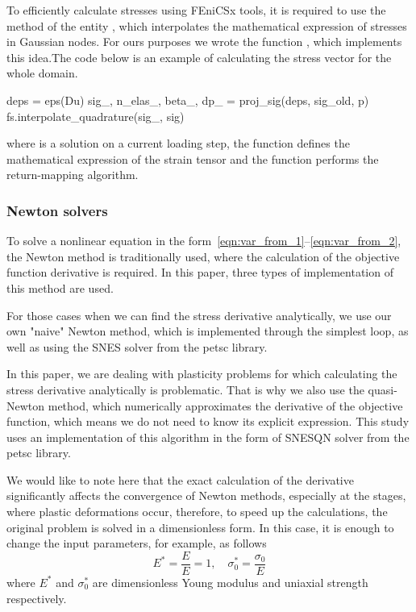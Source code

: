 \documentclass[12pt]{article}
\begin{document}
To efficiently calculate stresses using FEniCSx tools, it is required to use the  method of the entity , which interpolates the mathematical expression of stresses in Gaussian nodes. For ours purposes we wrote the function , which implements this idea.The code below is an example of calculating the stress vector for the whole domain.
\begin{pythoncode}
    deps = eps(Du)
    sig_, n_elas_, beta_, dp_ = proj_sig(deps, sig_old, p)
    fs.interpolate_quadrature(sig_, sig)
\end{pythoncode}
where  is a solution on a current loading step, the function  defines the mathematical expression of the strain tensor and the function  performs the return-mapping algorithm.

\subsubsection{Newton solvers}
To solve a nonlinear equation in the form~\ref{eqn:var_from_1}--\ref{eqn:var_from_2}, the Newton method is traditionally used, where the calculation of the objective function derivative is required. In this paper, three types of implementation of this method are used.

For those cases when we can find the stress derivative analytically, we use our own "naive" Newton method, which is implemented through the simplest loop, as well as using the SNES solver from the petsc library. 

In this paper, we are dealing with plasticity problems for which calculating the stress derivative analytically is problematic. That is why we also use the quasi-Newton method, which numerically approximates the derivative of the objective function, which means we do not need to know its explicit expression. This study uses an implementation of this algorithm in the form of SNESQN solver from the petsc library.

We would like to note here that the exact calculation of the derivative significantly affects the convergence of Newton methods, especially at the stages, where plastic deformations occur, therefore, to speed up the calculations, the original problem is solved in a dimensionless form. In this case, it is enough to change the input parameters, for example, as follows
\begin{equation}
    E^* = \frac{E}{E} = 1, \quad \sigma_0^* = \frac{\sigma_0}{E}
\end{equation}
where $E^*$ and $\sigma_0^*$ are dimensionless Young modulus and uniaxial strength respectively.
\end{document}
